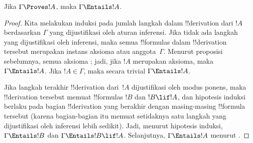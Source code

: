 \documentclass[../../../include/open-logic-section]{subfiles}
\begin{document}
\begin{thm}[Kesahihan]
Jika $\Gamma \Proves !A$, maka $\Gamma \Entails !A$.
\end{thm}

\begin{proof}
Kita melakukan induksi pada jumlah langkah dalam !!{derivation} dari
$!A$ berdasarkan $\Gamma$ yang dijustifikasi oleh aturan inferensi. Jika
tidak ada langkah yang dijustifikasi oleh inferensi, maka semua
!!{formula}s dalam !!{derivation} tersebut merupakan instans aksioma atau
anggota~$\Gamma$. Menurut proposisi sebelumnya, semua aksioma
; jadi, jika $!A$ merupakan
aksioma, maka $\Gamma \Entails !A$. Jika $!A \in \Gamma$, maka secara
trivial $\Gamma \Entails !A$.

Jika langkah terakhir !!{derivation} dari~$!A$ dijustifikasi oleh modus
ponens, maka !!{derivation} tersebut memuat !!{formula}s $!B$ dan
$!B \lif !A$, dan hipotesis induksi berlaku pada bagian !!{derivation}
yang berakhir dengan masing-masing !!{formula} tersebut (karena
bagian-bagian itu memuat setidaknya satu langkah yang dijustifikasi oleh
inferensi lebih sedikit). Jadi, menurut hipotesis induksi,
$\Gamma \Entails !B$ dan $\Gamma \Entails !B \lif !A$. Selanjutnya,
$\Gamma \Entails !A$ menurut
      {}
      {}.

\end{proof}
\end{document}
